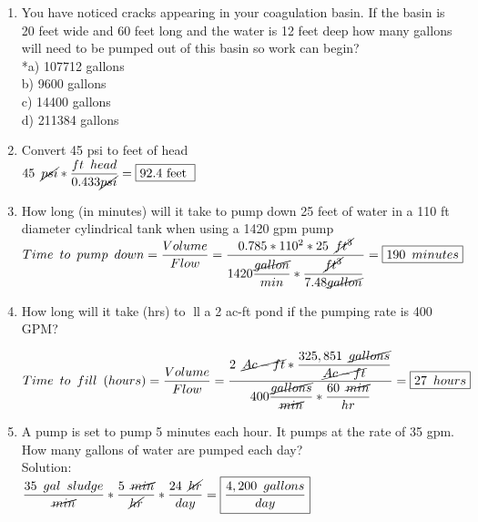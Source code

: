 \documentclass{article}
\begin{document}
\begin{enumerate}

  \item You have noticed cracks appearing in your coagulation basin. If the basin is 20 feet wide and 60 feet long and the water is 12 feet deep how many gallons will need to be pumped out of this basin so work can begin?\\
*a) 107712 gallons\\
b) 9600 gallons\\
c) 14400 gallons\\
d) 211384 gallons\\

  
\item Convert 45 psi to feet of head\\

 
$
45 \enspace \cancel{psi}*\dfrac{ft \enspace head}{0.433\cancel{psi}}=\boxed{92.4 \text { feet }}
$
 
 \vspace{0.2cm}
 
\item How long (in minutes) will it take to pump down 25 feet of water in a 110 ft diameter cylindrical tank when using a 1420 gpm pump\\
  
  $Time \enspace to \enspace pump \enspace down= \dfrac{Volume}{Flow}=\dfrac{0.785*110^2*25 \enspace \cancel{ft^3}}{1420\dfrac{\cancel{gallon}}{min}*\dfrac{\cancel{ft^3}}{7.48\cancel{gallon}}}=\boxed{190 \enspace minutes}$
 
 \vspace{0.2cm}

\item How long will it take (hrs) to ll a 2 ac-ft pond if the pumping rate is 400 GPM?\\

 
 \vspace{0.2cm}
 
 $Time \enspace to \enspace fill \enspace(hours)= \dfrac{Volume}{Flow}=\dfrac{2 \enspace \cancel{Ac-ft}*\dfrac{325,851 \enspace \cancel{gallons}}{\cancel{Ac-ft}}}{400 \dfrac{\cancel{gallons}}{\cancel{min}}*\dfrac{60 \enspace\cancel{ min}}{hr}}=\boxed{27 \enspace hours}$\\
 
\item A pump is set to pump 5 minutes each hour. It pumps at the rate of 35 gpm. How many gallons of water are pumped each day?\\
Solution:\\
$\dfrac{35 \enspace gal \enspace sludge}{\cancel{min}}*\dfrac{5 \enspace \cancel{min}}{\cancel{hr}} *\dfrac{24 \enspace \cancel{hr}}{day}=\boxed{\dfrac{4,200 \enspace gallons}{day}}$\\
\vspace{0.5cm}


\end{enumerate}
\end{document}
